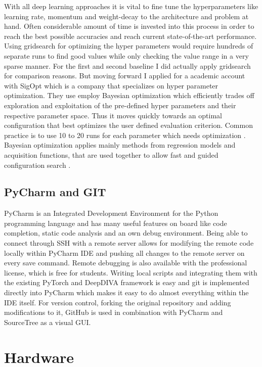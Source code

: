 With all deep learning approaches it is vital to fine tune the hyperparameters like learning rate, momentum and weight-decay to the architecture and problem at hand. Often considerable amount of time is invested into this process in order to reach the best possible accuracies and reach current state-of-the-art performance. Using gridsearch for optimizing the hyper parameters would require hundreds of separate runs to find good values while only checking the value range in a very sparse manner. For the first and second baseline I did actually apply gridsearch for comparison reasons. But moving forward I applied for a academic account with SigOpt \cite{sigopt} which is a company that specializes on hyper parameter optimization. They use employ Bayesian optimization which efficiently trades off exploration and exploitation of the pre-defined hyper parameters and their respective parameter space. Thus it moves quickly towards an optimal configuration that best optimizes the user defined evaluation criterion. Common practice is to use 10 to 20 runs for each parameter which needs optimization \cite{sigoptObservationBudget}. Bayesian optimization applies mainly methods from regression models and acquisition functions, that are used together to allow fast and guided configuration search \cite{sigoptBayesian}.

\subsection{PyCharm and GIT}

PyCharm \cite{PyCharm} is an Integrated Development Environment for the Python programming language and has many useful features on board like code completion, static code analysis and an own debug environment. Being able to connect through SSH with a remote server allows for modifying the remote code locally within PyCharm IDE and pushing all changes to the remote server on every save command. Remote debugging is also available with the professional license, which is free for students. Writing local scripts and integrating them with the existing PyTorch and DeepDIVA framework is easy and git is implemented directly into PyCharm which makes it easy to do almost everything within the IDE itself.
For version control, forking the original repository and adding modifications to it, GitHub \cite{GitHub} is used in combination with PyCharm and SourceTree \cite{SourceTree} as a visual GUI.

\section{Hardware}

